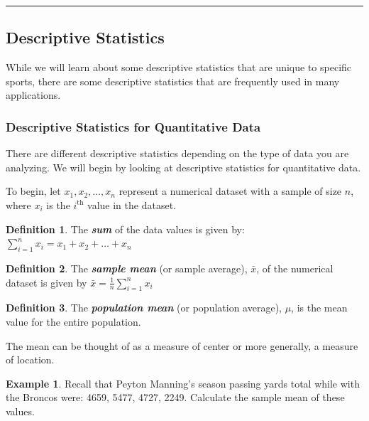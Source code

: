 \documentclass[
]{book}
\theoremstyle{definition}
\newtheorem{definition}{Definition}[chapter]
\theoremstyle{definition}
\newtheorem{example}{Example}[chapter]
\theoremstyle{definition}
\theoremstyle{definition}
\theoremstyle{remark}
\begin{document}
\hfill\break
\hfill\break
\hfill\break
\hfill\break
\hfill\break

\begin{center}\rule{0.5\linewidth}{0.5pt}\end{center}

\hypertarget{descriptive-statistics-1}{%
\subsection{Descriptive Statistics}\label{descriptive-statistics-1}}

While we will learn about some descriptive statistics that are unique to specific sports, there are some descriptive statistics that are frequently used in many applications.

\hypertarget{descriptive-statistics-for-quantitative-data}{%
\subsubsection{Descriptive Statistics for Quantitative Data}\label{descriptive-statistics-for-quantitative-data}}

There are different descriptive statistics depending on the type of data you are analyzing. We will begin by looking at descriptive statistics for quantitative data.

To begin, let \(x_1, x_2, \ldots, x_n\) represent a numerical dataset with a sample of size \(n\), where \(x_i\) is the \(i^\text{th}\) value in the dataset.

\begin{definition}
The \textbf{\emph{sum}} of the data values is given by: \(\sum_{i=1}^n x_i = x_1 + x_2 + \ldots + x_n\)
\end{definition}

\begin{definition}
The \textbf{\emph{sample mean}} (or sample average), \(\bar{x}\), of the numerical dataset is given by \(\bar{x} = \frac{1}{n} \sum_{i=1}^n x_i\)
\end{definition}

\begin{definition}
The \textbf{\emph{population mean}} (or population average), \(\mu\), is the mean value for the entire population.
\end{definition}

The mean can be thought of as a measure of center or more generally, a measure of location.

\begin{example}
Recall that Peyton Manning's season passing yards total while with the Broncos were: 4659, 5477, 4727, 2249. Calculate the sample mean of these values.
\end{example}
\end{document}
